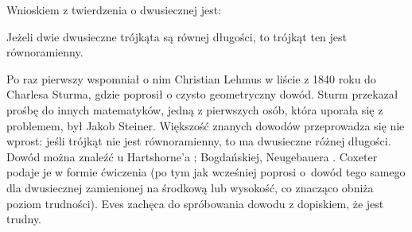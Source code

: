 %

Wnioskiem z twierdzenia o dwusiecznej jest:

\begin{theorem}
    \label{theorem_steiner_lehmus}%
	Jeżeli dwie dwusieczne trójkąta są równej długości, to trójkąt ten jest równoramienny.
\end{theorem}

Po raz pierwszy wspomniał o nim Christian Lehmus w liście z 1840 roku do Charlesa Sturma, gdzie poprosił o czysto geometryczny dowód.
%
%
Sturm przekazał prośbę do innych matematyków, jedną z pierwszych osób, która uporała się z problemem, był Jakob Steiner.
%
Większość znanych dowodów przeprowadza się nie wprost: jeśli trójkąt nie jest równoramienny, to ma dwusieczne różnej długości.
Dowód można znaleźć u Hartshorne'a \cite[s. 11]{hartshorne2000}; Bogdańskiej, Neugebauera \cite[s. 74]{neugebauer_2018}.
Coxeter \cite[s. 32]{coxeter_1967} podaje je w formie ćwiczenia (po tym jak wcześniej \cite[s. 26, 33]{coxeter_1967} poprosi o~dowód tego samego dla dwusiecznej zamienionej na środkową lub wysokość, co znacząco obniża poziom trudności).
Eves \cite[s. 19]{eves1_1972} zachęca do spróbowania dowodu z dopiskiem, że jest trudny. 

%